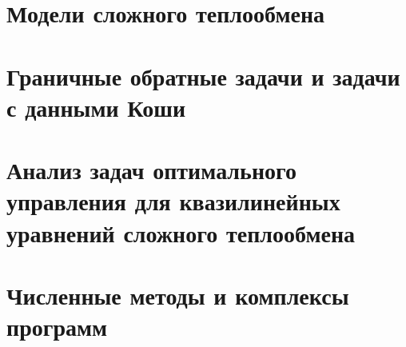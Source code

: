 \documentclass[a4paper,14pt,oneside,openany]{memoir}
\begin{document}
    \gappto\captionsrussian{\unskip} %
    



    \chapter{Модели сложного теплообмена}\label{ch:ch1}
    
    
    
    
    
    


    \chapter{Граничные обратные задачи и задачи с данными Коши}
    \label{ch:ch2}
    
    
    
    


    \chapter{Анализ задач оптимального управления для квазилинейных уравнений сложного теплообмена}
    \label{ch:ch3}
%    
    
    


    \chapter{Численные методы и комплексы программ}\label{ch:ch4}
    
    
    
    

\end{document}
